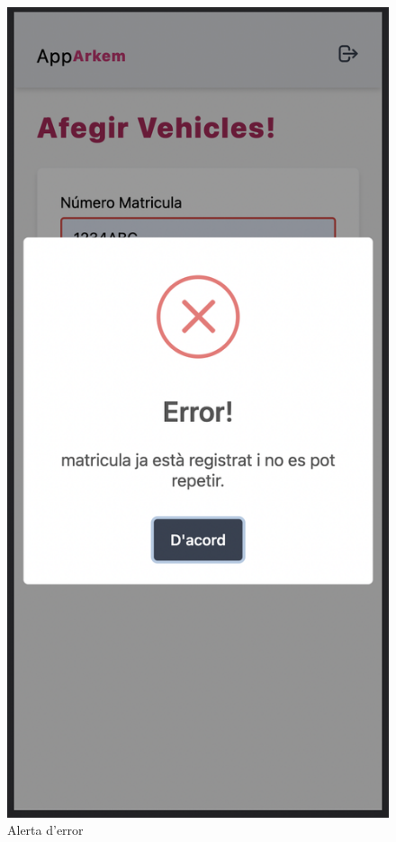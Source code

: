 \begin{figure}[H]
    \begin{center}
        \includegraphics[scale=0.50]{Fotos/pantalla15_bannerError.png}
    \end{center}
    \caption{Alerta d'error}
    \label{fig:error_alert}
\end{figure}